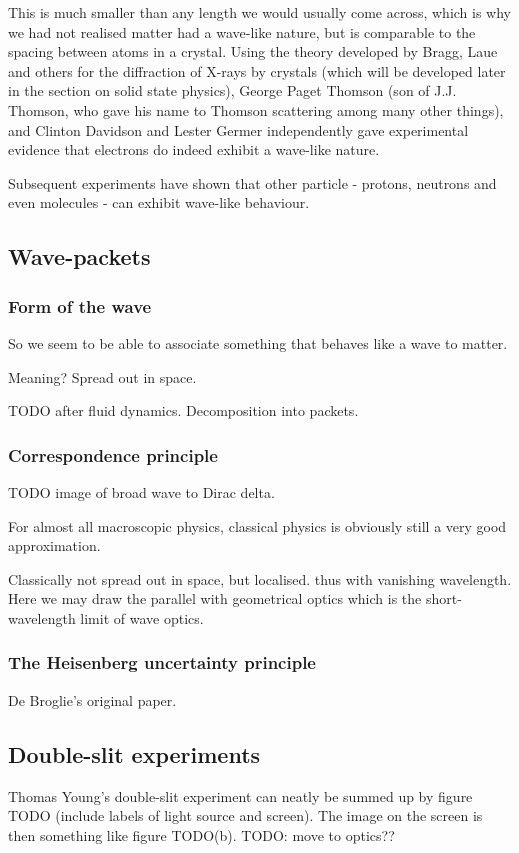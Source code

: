 This is much smaller than any length we would usually come across, which is why we had not realised matter had a wave-like nature, but is comparable to the spacing between atoms in a crystal. Using the theory developed by Bragg, Laue and others for the diffraction of X-rays by crystals (which will be developed later in the section on solid state physics), George Paget Thomson (son of J.J. Thomson, who gave his name to Thomson scattering among many other things), and Clinton Davidson and Lester Germer independently gave experimental evidence that electrons do indeed exhibit a wave-like nature.

Subsequent experiments have shown that other particle - protons, neutrons and even molecules - can exhibit wave-like behaviour.

\subsection{Wave-packets}
\subsubsection{Form of the wave}
So we seem to be able to associate something that behaves like a wave to matter.

Meaning? Spread out in space.

TODO after fluid dynamics. Decomposition into packets.
\subsubsection{Correspondence principle}
TODO image of broad wave to Dirac delta.

For almost all macroscopic physics, classical physics is obviously still a very good approximation.

Classically not spread out in space, but localised.  thus with vanishing wavelength. Here we may draw the parallel with geometrical optics which is the short-wavelength limit of wave optics. 
\subsubsection{The Heisenberg uncertainty principle}
De Broglie's original paper.

\subsection{Double-slit experiments}
Thomas Young's double-slit experiment can neatly be summed up by figure TODO (include labels of light source and screen). The image on the screen is then something like figure TODO(b). TODO: move to optics??

